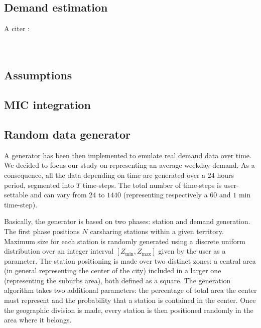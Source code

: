 \begin{bibunit}[ieeetr]
\newpage
\section{Demand estimation}

A citer :\\
\cite{modele_deplacement_dreif_2008}\\
\cite{danielis_potential_2015}\\


\subsection{Assumptions}
\subsection{MIC integration}
\subsection{Random data generator}
A generator has been then implemented to emulate real demand data over time. We decided to focus our study on representing an average weekday demand. As a consequence, all the data depending on time are generated over a $24$ hours period, segmented into $T$ time-steps. The total number of time-steps is user-settable and can vary from $24$ to $1440$ (representing respectively a $60$ and $1$ min time-step).

Basically, the generator is based on two phases: station and demand generation. The first phase positions $N$ carsharing stations within a given territory. Maximum size for each station is randomly generated using a discrete uniform distribution over an integer interval $[Z_{\min}, Z_{\max}]$ given by the user as a parameter.
The station positioning is made over two distinct zones: a central area (in general representing the center of the city) included in a larger one (representing the suburbs area), both defined as a square. The generation algorithm takes two additional parameters: the percentage of total area the center must represent and the probability that a station is contained in the center. Once the geographic division is made, every station is then positioned randomly in the area where it belongs. 



\end{bibunit}
